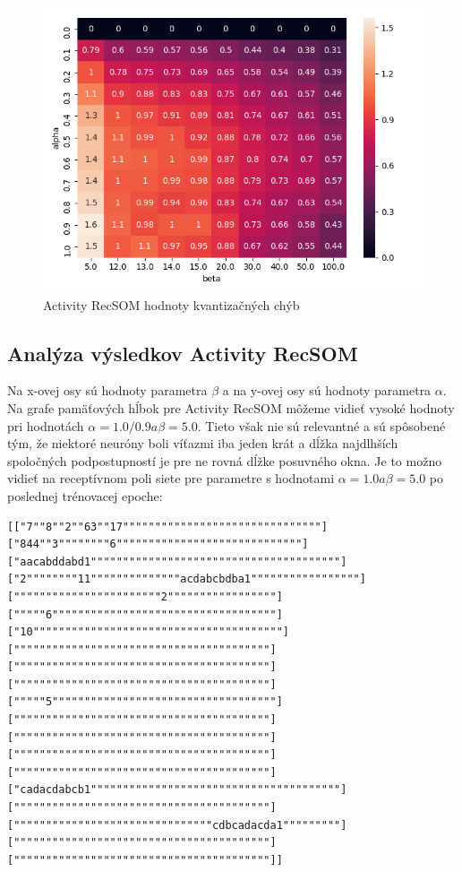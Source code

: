     \begin{figure}[H]
        \centering
        \includegraphics[width=\textwidth]{assets/activity_recsom_errors}
        \caption{Activity RecSOM hodnoty kvantizačných chýb}
    \end{figure}
    
\subsection{Analýza výsledkov Activity RecSOM}
Na x-ovej osy sú hodnoty parametra $\beta$ a na y-ovej osy sú hodnoty parametra $\alpha$.
Na grafe pamäťových hĺbok pre Activity RecSOM môžeme vidieť vysoké hodnoty pri hodnotách $\alpha = 1.0/0.9 a \beta = 5.0$.
Tieto však nie sú relevantné a sú spôsobené tým, že niektoré neuróny boli víťazmi iba jeden krát a dĺžka 
najdlhších spoločných podpostupností je pre ne rovná dĺžke posuvného okna. Je to možno vidieť na 
receptívnom poli siete pre parametre s hodnotami $\alpha = 1.0 a \beta = 5.0$ po poslednej trénovacej epoche:

\begin{lstlisting}
[["7""8""2""63""17"""""""""""""""""""""""""""""""]
["844""3""""""""6"""""""""""""""""""""""""""""]
["aacabddabd1"""""""""""""""""""""""""""""""""""""""]
["2""""""""11""""""""""""""acdabcbdba1"""""""""""""""""]
["""""""""""""""""""""""2"""""""""""""""""]
["""""6"""""""""""""""""""""""""""""""""""]
["10"""""""""""""""""""""""""""""""""""""""]
[""""""""""""""""""""""""""""""""""""""""]
[""""""""""""""""""""""""""""""""""""""""]
[""""""""""""""""""""""""""""""""""""""""]
["""""5"""""""""""""""""""""""""""""""""""]
[""""""""""""""""""""""""""""""""""""""""]
[""""""""""""""""""""""""""""""""""""""""]
[""""""""""""""""""""""""""""""""""""""""]
[""""""""""""""""""""""""""""""""""""""""]
["cadacdabcb1"""""""""""""""""""""""""""""""""""""""]
[""""""""""""""""""""""""""""""""""""""""]
["""""""""""""""""""""""""""""""cdbcadacda1"""""""""]
[""""""""""""""""""""""""""""""""""""""""]
[""""""""""""""""""""""""""""""""""""""""]]
\end{lstlisting}

